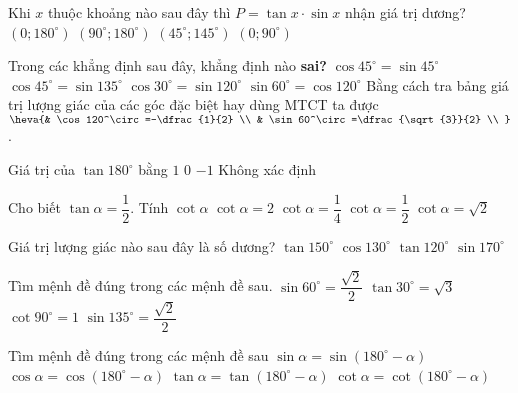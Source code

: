 \begin{ex} 
	Khi $x$ thuộc khoảng nào sau đây thì $P=\tan x\cdot\sin x$ nhận giá trị dương?
	\choice
	{$\left(0;180^\circ\right)$}
	{$\left(90^\circ;180^\circ\right)$}
	{$\left(45^\circ;145^\circ\right)$}
	{\True $\left(0;90^\circ\right)$}
\end{ex}
\begin{ex}
	Trong các khẳng định sau đây, khẳng định nào \textbf{sai?}
	\choice
	{$\cos 45^\circ=\sin 45^\circ$}
	{$\cos 45^\circ=\sin {135^\circ}$}
	{$\cos 30^\circ=\sin 120^\circ$}
	{\True $\sin 60^\circ=\cos 120^\circ$}
	\loigiai
	{Bằng cách tra bảng giá trị lượng giác của các góc đặc biệt hay dùng MTCT ta được $\heva{& \cos 120^\circ=-\dfrac{1}{2} \\ 
			& \sin 60^\circ=\dfrac{\sqrt{3}}{2} \\ 
		}$.}
\end{ex}
\begin{ex}
	Giá trị của $\tan180^\circ$ bằng
	\choice
	{$1$}
	{\True $0$}
	{$-1$}
	{Không xác định}
\end{ex}
\begin{ex}
	Cho biết $\tan\alpha=\dfrac{1}{2}$. Tính $\cot\alpha$
	\choice
	{\True $\cot\alpha=2$}
	{$\cot\alpha=\dfrac{1}{4}$}
	{$\cot\alpha=\dfrac{1}{2}$}
	{$\cot\alpha=\sqrt{2}$}
\end{ex}
\begin{ex}
	Giá trị lượng giác nào sau đây là số dương?
	\choice
	{$\tan 150^\circ$}
	{$\cos 130^\circ$}
	{$\tan 120^\circ$}
	{\True $\sin 170^\circ$}
\end{ex} 
\begin{ex}
	Tìm mệnh đề đúng trong các mệnh đề sau.
	\choice
	{$\sin 60^\circ=\dfrac{\sqrt{2}}{2}$}
	{$\tan 30^\circ=\sqrt{3}$}
	{$\cot 90^\circ=1$}
	{\True $\sin 135^\circ=\dfrac{\sqrt{2}}{2}$}
\end{ex}
\begin{ex}
	Tìm mệnh đề đúng trong các mệnh đề sau
	\choice
	{\True $\sin\alpha=\sin(180^\circ-\alpha)$}
	{$\cos\alpha=\cos(180^\circ-\alpha)$}
	{$\tan\alpha=\tan(180^\circ-\alpha)$}
	{$\cot\alpha=\cot(180^\circ-\alpha)$}
\end{ex}

